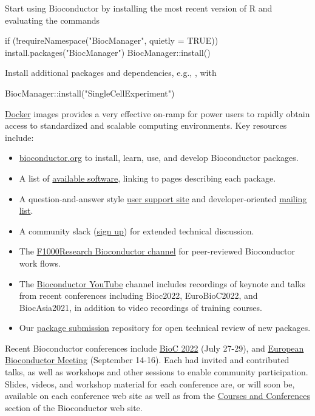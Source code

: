 Start using
Bioconductor by installing the most recent version of R and evaluating
the commands
\begin{example}
  if (!requireNamespace("BiocManager", quietly = TRUE))
      install.packages("BiocManager")
  BiocManager::install()
\end{example}
Install additional packages and dependencies,
e.g., , with
\begin{example}
  BiocManager::install("SingleCellExperiment")
\end{example}
\href{https://bioconductor.org/help/docker/}{Docker}
images provides a very effective on-ramp for power users to rapidly
obtain access to standardized and scalable computing environments.
Key resources include:
\begin{itemize}
\item \href{https://bioconductor.org}{bioconductor.org} to install,
  learn, use, and develop Bioconductor packages.
\item A list of \href{https://bioconductor.org/packages}{available
  software}, linking to pages describing each package.
\item A question-and-answer style
  \href{https://support.bioconductor.org}{user support site} and
  developer-oriented
  \href{https://stat.ethz.ch/mailman/listinfo/bioc-devel}{mailing
    list}.
\item A community slack (\href{https://bioc-community.herokuapp.com/}{sign up})
   for extended technical discussion.
\item The
  \href{https://f1000research.com/channels/bioconductor}{F1000Research
    Bioconductor channel} for peer-reviewed Bioconductor work flows.
\item The \href{https://www.youtube.com/user/bioconductor}{Bioconductor YouTube} 
     channel includes recordings of keynote and talks from recent 
     conferences including Bioc2022, EuroBioC2022, and BiocAsia2021, in addition to 
     video recordings of training courses. 
\item Our \href{https://github.com/Bioconductor/Contributions}{package
  submission} repository for open technical review of new packages.
\end{itemize}

Recent Bioconductor conferences include
\href{https://bioc2022.bioconductor.org}{BioC 2022} (July 27-29),
and 
\href{https://eurobioc2022.bioconductor.org/}{European Bioconductor Meeting}
(September 14-16). Each had invited and contributed talks, as well as
workshops and other sessions to enable community
participation. Slides, videos, and workshop material for each
conference are, or will soon be, available on each conference web site
as well as from
the \href{http://bioconductor.org/help/course-materials/}{Courses and
Conferences} section of the Bioconductor web
site.

